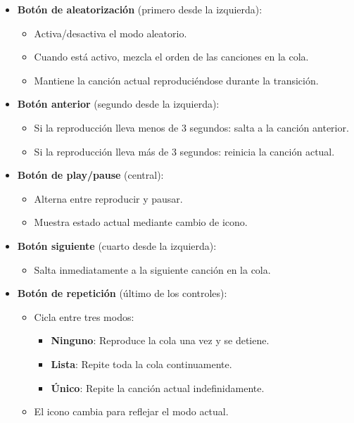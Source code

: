\documentclass[11pt, a4paper]{article}
\begin{document}
    \begin{itemize}
      \item \textbf{Botón de aleatorización} (primero desde la izquierda):
      \begin{itemize}
        \item Activa/desactiva el modo aleatorio.
        \item Cuando está activo, mezcla el orden de las canciones en la cola.
        \item Mantiene la canción actual reproduciéndose durante la transición.
      \end{itemize}
        
      \item \textbf{Botón anterior} (segundo desde la izquierda):
      \begin{itemize}
        \item Si la reproducción lleva menos de 3 segundos: salta a la canción anterior.
        \item Si la reproducción lleva más de 3 segundos: reinicia la canción actual.
      \end{itemize}
        
      \item \textbf{Botón de play/pause} (central):
        \begin{itemize}
          \item Alterna entre reproducir y pausar.
          \item Muestra estado actual mediante cambio de icono.
        \end{itemize}
        
      \item \textbf{Botón siguiente} (cuarto desde la izquierda):
        \begin{itemize}
          \item Salta inmediatamente a la siguiente canción en la cola.
        \end{itemize}
        
      \item \textbf{Botón de repetición} (último de los controles):
        \begin{itemize}
          \item Cicla entre tres modos:
            \begin{itemize}
              \item \textbf{Ninguno}: Reproduce la cola una vez y se detiene.
              \item \textbf{Lista}: Repite toda la cola continuamente.
              \item \textbf{Único}: Repite la canción actual indefinidamente.
            \end{itemize}
          \item El icono cambia para reflejar el modo actual.
        \end{itemize}
    \end{itemize}
\end{document}
